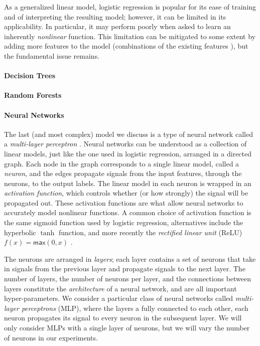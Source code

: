 As a generalized linear model, logistic regression is popular for its
ease of training and of interpreting the resulting model; however, it
can be limited in its applicability.
%
In particular, it may perform poorly when asked to learn an inherently
\emph{nonlinear} function.
%
This limitation can be mitigated to some extent by adding more features
to the model (\eg combinations of the existing features ), but
the fundamental issue remains.

\paragraph{Decision Trees}

\paragraph{Random Forests}

\paragraph{Neural Networks}
The last (and most complex) model we discuss is a type of neural network
called a \emph{multi-layer perceptron} .
%
Neural networks can be understood as a collection of linear models, just
like the one used in logistic regression, arranged in a directed graph.
%
Each node in the graph corresponds to a single linear model, called a
\emph{neuron}, and the edges propagate signals from the input features,
through the neurons, to the output labels.
%
The linear model in each neuron is wrapped in an \emph{activation
  function}, which controls whether (or how strongly) the signal will be
propagated out.
%
These activation functions are what allow neural networks to accurately
model nonlinear functions.
%
A common choice of activation function is the same sigmoid function
used by logistic regression, alternatives include the hyperbolic $\tanh$
function, and more recently the \emph{rectified linear unit} (ReLU)
$f(x) = \mathsf{max}(0,x)$ .

The neurons are arranged in \emph{layers}; each layer contains a set of
neurons that take in signals from the previous layer and propagate
signals to the next layer.
%
The number of layers, the number of neurons per layer, and the
connections between layers constitute the \emph{architecture} of a
neural network, and are all important hyper-parameters.
%
We consider a particular class of neural networks called
\emph{multi-layer perceptrons} (MLP), where the layers a fully connected to
each other, \ie each neuron propagates its signal to every neuron in the
subsequent layer.
%
We will only consider MLPs with a single layer of neurons, but we will
vary the number of neurons in our experiments.

